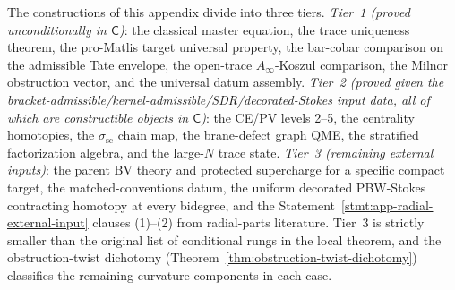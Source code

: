 \begin{rmk}
\label{rmk:completion-three-tier}
The constructions of this appendix divide into three tiers.
\textit{Tier~1 (proved unconditionally in \(\mathsf C\))}: the
classical master equation, the trace uniqueness theorem, the
pro-Matlis target universal property, the bar-cobar comparison
on the admissible Tate envelope, the open-trace
\(A_\infty\)-Koszul comparison, the Milnor obstruction vector,
and the universal datum assembly.  \textit{Tier~2 (proved given
the bracket-admissible/kernel-admissible/SDR/decorated-Stokes
input data, all of which are constructible objects in
\(\mathsf C\))}: the CE/PV levels 2--5, the centrality
homotopies, the \(\sigma_{\mathrm{sc}}\) chain map, the brane-defect
graph QME, the stratified factorization algebra, and the
large-\(N\) trace state.  \textit{Tier~3 (remaining external
inputs)}: the parent BV theory and protected supercharge for a
specific compact target, the matched-conventions datum, the
uniform decorated PBW-Stokes contracting homotopy at every
bidegree, and the Statement~\ref{stmt:app-radial-external-input}
clauses (1)--(2) from radial-parts literature.  Tier~3 is
strictly smaller than the original list of conditional rungs in
the local theorem, and the obstruction-twist dichotomy
(Theorem~\ref{thm:obstruction-twist-dichotomy}) classifies the
remaining curvature components in each case.
\end{rmk}
